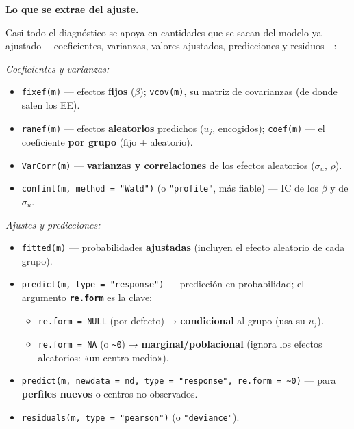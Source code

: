 \documentclass[
  letterpaper,
  DIV=11,
  numbers=noendperiod]{scrartcl}
\providecommand{\tightlist}{%
  \setlength{\itemsep}{0pt}\setlength{\parskip}{0pt}}\usepackage{longtable,booktabs,array}
\begin{document}
\textbf{Lo que se extrae del ajuste.}

Casi todo el diagnóstico se apoya en cantidades que se sacan del modelo
ya ajustado ---coeficientes, varianzas, valores ajustados, predicciones
y residuos---:

\begin{tcolorbox}[enhanced jigsaw, coltitle=black, rightrule=.15mm, arc=.35mm, leftrule=.75mm, colback=white, colbacktitle=quarto-callout-tip-color!10!white, left=2mm, breakable, toptitle=1mm, toprule=.15mm, bottomtitle=1mm, titlerule=0mm, title=\textcolor{quarto-callout-tip-color}{\faLightbulb}\hspace{0.5em}{🔧 En R. Extraer de un GLMM ajustado \texttt{m}}, bottomrule=.15mm, opacityback=0, opacitybacktitle=0.6, colframe=quarto-callout-tip-color-frame]

\emph{Coeficientes y varianzas:}

\begin{itemize}
\tightlist
\item
  \texttt{fixef(m)} --- efectos \textbf{fijos} (\(\beta\));
  \texttt{vcov(m)}, su matriz de covarianzas (de donde salen los EE).
\item
  \texttt{ranef(m)} --- efectos \textbf{aleatorios} predichos (\(u_j\),
  encogidos); \texttt{coef(m)} --- el coeficiente \textbf{por grupo}
  (fijo + aleatorio).
\item
  \texttt{VarCorr(m)} --- \textbf{varianzas y correlaciones} de los
  efectos aleatorios (\(\sigma_u\), \(\rho\)).
\item
  \texttt{confint(m,\ method\ =\ "Wald")} (o \texttt{"profile"}, más
  fiable) --- IC de los \(\beta\) y de \(\sigma_u\).
\end{itemize}

\emph{Ajustes y predicciones:}

\begin{itemize}
\tightlist
\item
  \texttt{fitted(m)} --- probabilidades \textbf{ajustadas} (incluyen el
  efecto aleatorio de cada grupo).
\item
  \texttt{predict(m,\ type\ =\ "response")} --- predicción en
  probabilidad; el argumento \textbf{\texttt{re.form}} es la clave:

  \begin{itemize}
  \tightlist
  \item
    \texttt{re.form\ =\ NULL} (por defecto) → \textbf{condicional} al
    grupo (usa su \(u_j\)).
  \item
    \texttt{re.form\ =\ NA} (o \texttt{\textasciitilde{}0}) →
    \textbf{marginal/poblacional} (ignora los efectos aleatorios: «un
    centro medio»).
  \end{itemize}
\item
  \texttt{predict(m,\ newdata\ =\ nd,\ type\ =\ "response",\ re.form\ =\ \textasciitilde{}0)}
  --- para \textbf{perfiles nuevos} o centros no observados.
\item
  \texttt{residuals(m,\ type\ =\ "pearson")} (o \texttt{"deviance"}).
\end{itemize}


\end{tcolorbox}
\end{document}
